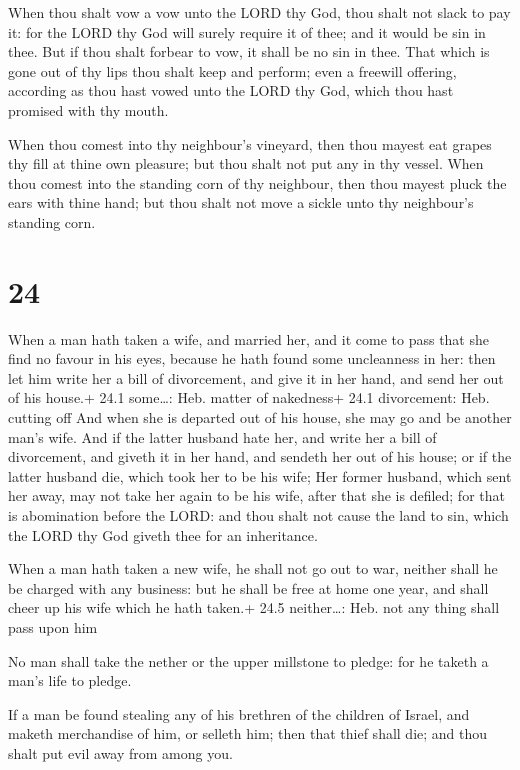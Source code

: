  When thou shalt vow a vow unto the LORD thy God, thou
shalt not slack to pay it: for the LORD thy God will surely require it
of thee; and it would be sin in thee.  But if thou shalt
forbear to vow, it shall be no sin in thee.  That which is
gone out of thy lips thou shalt keep and perform; even a freewill
offering, according as thou hast vowed unto the LORD thy God, which thou
hast promised with thy mouth.

 When thou comest into thy neighbour's vineyard, then
thou mayest eat grapes thy fill at thine own pleasure; but thou shalt
not put any in thy vessel.  When thou comest into the
standing corn of thy neighbour, then thou mayest pluck the ears with
thine hand; but thou shalt not move a sickle unto thy neighbour's
standing corn.

\hypertarget{section-23}{%
\section{24}\label{section-23}}

 When a man hath taken a wife, and married her, and it come
to pass that she find no favour in his eyes, because he hath found some
uncleanness in her: then let him write her a bill of divorcement, and
give it in her hand, and send her out of his house.+ 24.1 some\ldots:
Heb. matter of nakedness+ 24.1 divorcement: Heb. cutting off
 And when she is departed out of his house, she may go and
be another man's wife.  And if the latter husband hate her,
and write her a bill of divorcement, and giveth it in her hand, and
sendeth her out of his house; or if the latter husband die, which took
her to be his wife;  Her former husband, which sent her
away, may not take her again to be his wife, after that she is defiled;
for that is abomination before the LORD: and thou shalt not cause the
land to sin, which the LORD thy God giveth thee for an inheritance.

 When a man hath taken a new wife, he shall not go out to
war, neither shall he be charged with any business: but he shall be free
at home one year, and shall cheer up his wife which he hath taken.+ 24.5
neither\ldots: Heb. not any thing shall pass upon him

 No man shall take the nether or the upper millstone to
pledge: for he taketh a man's life to pledge.

 If a man be found stealing any of his brethren of the
children of Israel, and maketh merchandise of him, or selleth him; then
that thief shall die; and thou shalt put evil away from among you.

